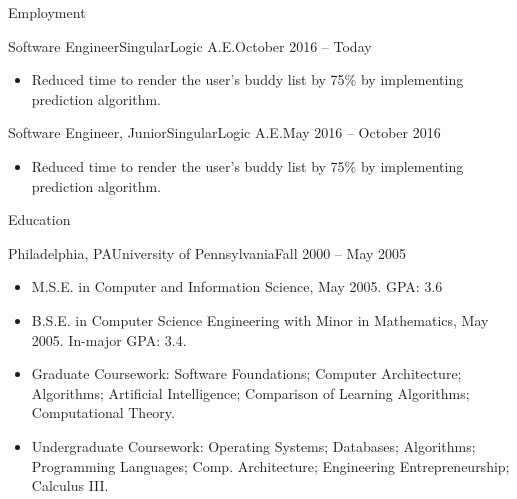 \documentclass[]{georgekircv}
\begin{document}
	\makeheader
	
	\begin{cvsection}{Employment}
		
		\begin{cvsubsection}{Software Engineer}{SingularLogic A.E.}{October 2016 -- Today}
			\begin{itemize}
				\item Reduced time to render the user’s buddy list by 75\% by implementing prediction algorithm.
			\end{itemize}
		\end{cvsubsection}
	
		\begin{cvsubsection}{Software Engineer, Junior}{SingularLogic A.E.}{May 2016 -- October 2016}
			\begin{itemize}
				\item Reduced time to render the user’s buddy list by 75\% by implementing prediction algorithm.
			\end{itemize}
		\end{cvsubsection}
		
	\end{cvsection}
	
	\begin{cvsection}{Education}
		\begin{cvsubsection}{Philadelphia, PA}{University of Pennsylvania}{Fall 2000 -- May 2005}
			\begin{itemize}
				\item M.S.E. in Computer and Information Science, May 2005. GPA: 3.6
				\item B.S.E. in Computer Science Engineering with Minor in Mathematics, May 2005.  In-major GPA: 3.4.
				\item Graduate Coursework: Software Foundations; Computer Architecture; Algorithms; Artificial Intelligence; Comparison of Learning Algorithms; Computational Theory.
				\item Undergraduate Coursework: Operating Systems; Databases; Algorithms; Programming Languages; Comp. Architecture; Engineering Entrepreneurship; Calculus III.
			\end{itemize}
		\end{cvsubsection}
	\end{cvsection}
	
\end{document}
